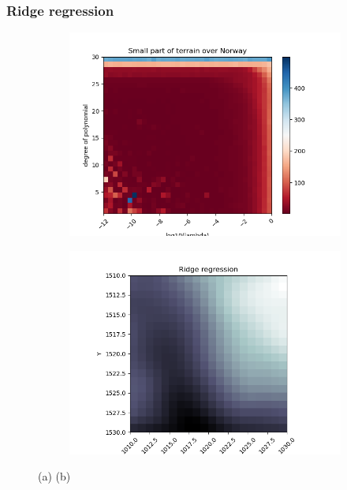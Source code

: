 \documentclass[../main.tex]{subfiles}
\begin{document}
\subsubsection{Ridge regression}

\begin{figure}[htb] 
   \centering
   \begin{subfigure}[b]{0.45\textwidth}
    \centering
    \includegraphics[width=\textwidth]{../assets/terrain-ridge-degree-lambda-colormap.png} 
    \caption{}
    
   \end{subfigure}
   \quad
   \begin{subfigure}[b]{0.45\textwidth}
    \centering
    \includegraphics[width=\textwidth]{../assets/Terrain_ridge_bestdegree.png} 
    \caption{}
   \end{subfigure}
   \caption{(a) (b) 
   }
   \label{fig:terrain-ridge}
\end{figure} 
\end{document}
